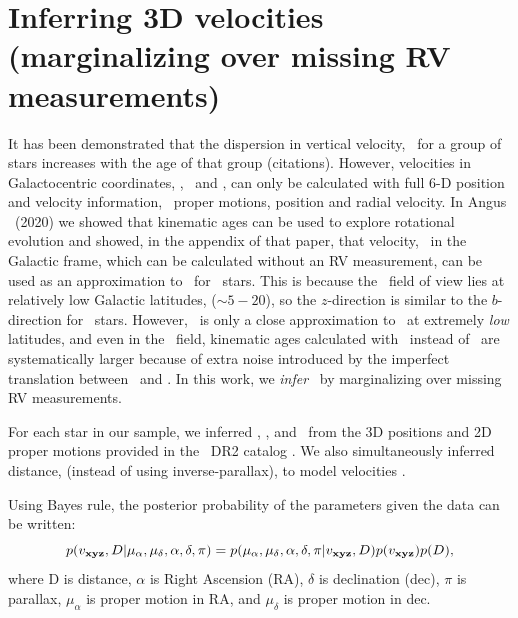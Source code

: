 \section{Inferring 3D velocities (marginalizing over missing RV
measurements)}
\label{sec:inference}

It has been demonstrated that the dispersion in vertical velocity, \vz\, for a
group of stars increases with the age of that group (citations).
However, velocities in Galactocentric coordinates, \vx, \vy\ and \vz, can only
be calculated with full 6-D position and velocity information, \ie\ proper
motions, position and radial velocity.
In Angus \etal\ (2020) we showed that kinematic ages can be used to explore
rotational evolution and showed, in the appendix of that paper, that velocity,
\vb\ in the Galactic frame, which can be calculated without an RV measurement,
can be used as an approximation to \vz\ for \kepler\ stars.
This is because the \kepler\ field of view lies at relatively low Galactic
latitudes, ($\sim 5-20$\degrees), so the $z$-direction is similar to the
$b$-direction for \kepler\ stars.
However, \vb\ is only a close approximation to \vz\ at extremely {\it low}
latitudes, and even in the \kepler\ field, kinematic ages calculated with \vb\
instead of \vz\ are systematically larger because of extra noise introduced by
the imperfect translation between \vb\ and \vz .
In this work, we {\it infer} \vz\ by marginalizing over missing RV
measurements.

For each star in our sample, we inferred \vx, \vy, and \vz\ from the 3D
positions and 2D proper motions provided in the \gaia\ DR2 catalog
\citep{brown2011}.
We also simultaneously inferred distance, (instead of using inverse-parallax),
to model velocities \citep[see \eg][]{bailer-jones2015, bailer-jones2018}.

Using Bayes rule, the posterior probability of the parameters given the data
can be written:
\begin{equation}
p(v_{\bf xyz}, D | \mu_{\alpha}, \mu_{\delta}, \alpha, \delta, \pi) =
    p(\mu_{\alpha}, \mu_{\delta}, \alpha, \delta, \pi | v_{\bf xyz}, D)
    p(v_{\bf xyz}) p(D),
\end{equation}
where D is distance, $\alpha$ is Right Ascension (RA), $\delta$ is declination
(dec), $\pi$ is parallax, $\mu_\alpha$ is proper motion in RA, and
$\mu_\delta$ is proper motion in dec.

